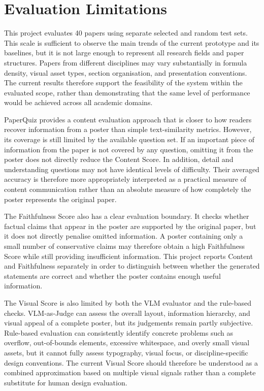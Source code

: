 \documentclass[12pt,oneside]{report}
\begin{document}
\section{Evaluation Limitations}

This project evaluates 40 papers using separate selected and random test sets. This scale is sufficient to observe the main trends of the current prototype and its baselines, but it is not large enough to represent all research fields and paper structures. Papers from different disciplines may vary substantially in formula density, visual asset types, section organisation, and presentation conventions. The current results therefore support the feasibility of the system within the evaluated scope, rather than demonstrating that the same level of performance would be achieved across all academic domains.

\vspace{1em}

PaperQuiz provides a content evaluation approach that is closer to how readers recover information from a poster than simple text-similarity metrics. However, its coverage is still limited by the available question set. If an important piece of information from the paper is not covered by any question, omitting it from the poster does not directly reduce the Content Score. In addition, detail and understanding questions may not have identical levels of difficulty. Their averaged accuracy is therefore more appropriately interpreted as a practical measure of content communication rather than an absolute measure of how completely the poster represents the original paper.

\vspace{1em}

The Faithfulness Score also has a clear evaluation boundary. It checks whether factual claims that appear in the poster are supported by the original paper, but it does not directly penalise omitted information. A poster containing only a small number of conservative claims may therefore obtain a high Faithfulness Score while still providing insufficient information. This project reports Content and Faithfulness separately in order to distinguish between whether the generated statements are correct and whether the poster contains enough useful information.

\vspace{1em}

The Visual Score is also limited by both the VLM evaluator and the rule-based checks. VLM-as-Judge can assess the overall layout, information hierarchy, and visual appeal of a complete poster, but its judgements remain partly subjective. Rule-based evaluation can consistently identify concrete problems such as overflow, out-of-bounds elements, excessive whitespace, and overly small visual assets, but it cannot fully assess typography, visual focus, or discipline-specific design conventions. The current Visual Score should therefore be understood as a combined approximation based on multiple visual signals rather than a complete substitute for human design evaluation.
\end{document}
